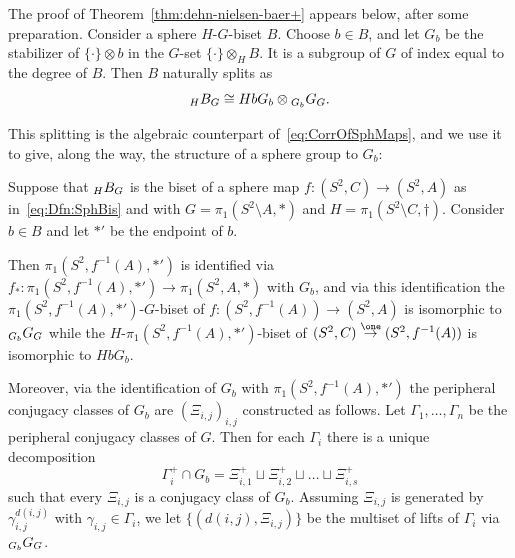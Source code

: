 \documentclass{amsart}
\begin{document}
The proof of Theorem~\ref{thm:dehn-nielsen-baer+} appears below,
after some preparation.  Consider a sphere $H$-$G$-biset $B$.  Choose
$b\in B$, and let $G_b$ be the stabilizer of $\{\cdot\}\otimes b$ in
the $G$-set $\{\cdot\}\otimes_H B$. It is a subgroup of $G$ of index
equal to the degree of $B$. Then $B$ naturally splits as
\begin{equation}
 \label{eq:DecOfSphBis}
 \subscript H B_{G} \cong H b G_b  \otimes \subscript{G_b}G_G. 
\end{equation}

This splitting is the algebraic counterpart
of~\eqref{eq:CorrOfSphMaps}, and we use it to give, along the way, the
structure of a sphere group to $G_b$:
\begin{lem}\label{lem:CorrOfSphBis}
  Suppose that $\subscript H B_G$ is the biset of a sphere map
  $f\colon (S^2,C)\to (S^2,A)$ as in~\eqref{eq:Dfn:SphBis}  and with
  $G=\pi_1(S^2\setminus A,*)$ and $H=\pi_1(S^2\setminus
  C,\dagger)$. Consider $b\in B$ and let $*'$ be the endpoint of
  $b$.

  Then $\pi_1(S^2,f^{-1}(A), *')$ is identified via
  $f_*\colon \pi_1(S^2,f^{-1}(A), *')\to \pi_1(S^2,A, *)$ with $G_b$,
  and via this identification the $\pi_1(S^2,f^{-1}(A),*')$-$G$-biset
  of $f\colon (S^2,f^{-1}(A))\to (S^2,A)$ is isomorphic to
  $\subscript{G_b}G_G$ while the $H$-$\pi_1(S^2,f^{-1}(A),*')$-biset of
  $(S^2,C)\overset{\one}{\rightarrow} (S^2,f^{-1}(A))$ is isomorphic
  to $H b G_b$.
 
  Moreover, via the identification of $G_b$ with
  $\pi_1(S^2,f^{-1}(A),*')$ the peripheral conjugacy classes of $G_b$
  are $(\Xi_{i,j})_{i,j}$ constructed as follows. Let
  $\Gamma_1,\dots,\Gamma_n$ be the peripheral conjugacy classes of
  $G$. Then for each $\Gamma_i$ there is a unique decomposition
  \begin{equation}\label{eq:SplGamToXi}
    \Gamma_i^+ \cap G_b = \Xi^{+}_{i,1}\sqcup \Xi^{+}_{i,2}\sqcup\dots \sqcup \Xi^{+}_{i,s} 
  \end{equation}
  such that every $\Xi_{i,j}$ is a conjugacy class of $G_b$. Assuming
  $\Xi_{i,j}$ is generated by $\gamma_{i,j}^{d(i,j)}$ with
  $\gamma_{i,j}\in \Gamma_i$, we let $\{(d(i,j),\Xi_{i,j})\}$ be the
  multiset of lifts of $\Gamma_i$ via $\subscript{G_b}G_{G}$.
\end{lem}
\end{document}
